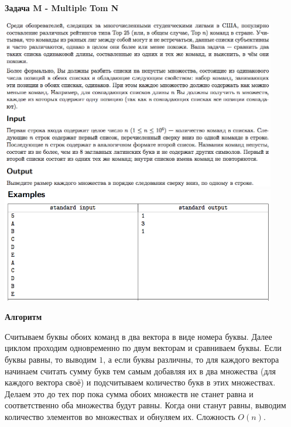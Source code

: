 \documentclass[a4paper,12pt]{article}
\begin{document}
\newpage
\textbf{{\large Задача M - Multiple Tom N}}

\begin{center}
\includegraphics[width=0.9\textwidth]{OC_America/OC_America_M1.png}\\ [1cm]
\includegraphics[width=0.9\textwidth]{OC_America/OC_America_M2.png}\\ [1cm]
\end{center}

\textbf{{\large Алгоритм}}

Считываем буквы обоих команд в два вектора в виде номера буквы. Далее циклом проходим одновременно по двум векторам и сравниваем буквы. Если буквы равны, то выводим $1$, а если буквы различны, то для каждого вектора начинаем считать сумму букв тем самым добавляя их в два множества (для каждого вектора своё) и подсчитываем количество букв в этих множествах. Делаем это до тех пор пока сумма обоих множеств не станет равна и соответственно оба множества будут равны. Когда они станут равны, выводим количество элементов во множествах и обнуляем их. Сложность $O(n)$.
\end{document}
